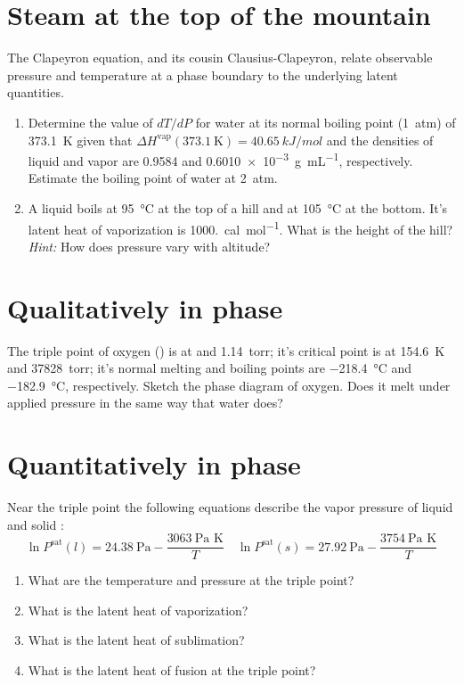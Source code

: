 \documentclass[11pt]{article}
\begin{document}
\section{Steam at the top of the mountain}
\label{sec:orgb1031ea}
The Clapeyron equation, and its cousin Clausius-Clapeyron, relate observable
  pressure and temperature at a phase boundary to the underlying latent
  quantities.
\begin{enumerate}
\item Determine the value of \(dT/dP\) for water at its normal boiling point (\SI{1}{atm})
of \SI{373.1}{K} given that \(\Delta
   H^\text{vap}(373.1~\text{K})=\SI{40.65}{kJ/mol}\) and the densities of liquid
and vapor are 0.9584 and \SI{0.6010e-3}{\gram\per\milli\liter}, respectively.
Estimate the boiling point of water at \SI{2}{atm}.

\item A liquid boils at \SI{95}{\celsius} at the top of a hill and at \SI{105}{\celsius} at the
bottom.  It's latent heat of vaporization is \SI{1000.}{cal\per\mole}.  What is the height
of the hill?  \emph{Hint:} How does pressure vary with altitude?
\end{enumerate}

\section{Qualitatively in phase}
\label{sec:org68d4d44}
The triple point of oxygen () is at  and \SI{1.14}{torr}; it's
  critical point is at \SI{154.6}{K} and \SI{37828}{torr}; it's normal melting and boiling
  points are \SI{-218.4}{\celsius} and \SI{-182.9}{\celsius}, respectively.
  Sketch the phase diagram of oxygen.  Does it melt under applied pressure in
  the same way that water does?

\section{Quantitatively in phase}
\label{sec:orgbdd7dc2}
Near the triple point the following equations describe the vapor pressure of
    liquid and solid :
\begin{equation*}
  \ln P^\text{sat}(l) = 24.38~\text{Pa} - \frac{3063~\text{Pa K}}{T} \quad  \ln P^\text{sat}(s) = 27.92~\text{Pa} - \frac{3754~\text{Pa K}}{T}
\end{equation*}

\begin{enumerate}
\item What are the temperature and pressure at the triple point?
\item What is the latent heat of vaporization?
\item What is the latent heat of sublimation?
\item What is the latent heat of fusion at the triple point?
\end{enumerate}
\end{document}
